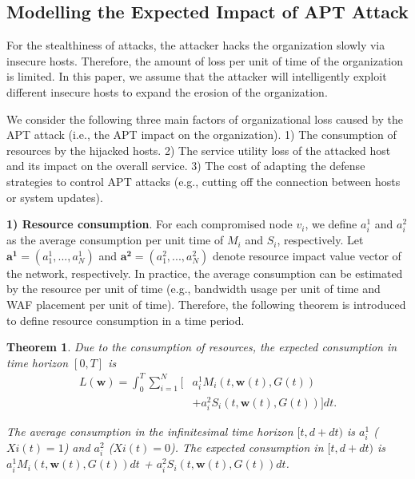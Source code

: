 \documentclass[lettersize,journal]{IEEEtran}
\newtheorem{theorem}{ \textbf{Theorem}}
\begin{document}
\subsection{Modelling the Expected Impact of APT Attack}\label{impact}
For the stealthiness of attacks, the attacker hacks the organization slowly via insecure hosts. Therefore, the amount of loss per unit of time of the organization is limited. In this paper, we assume that the attacker will intelligently exploit different insecure hosts to expand the erosion of the organization.\par
We consider the following three main factors of organizational loss caused by the APT attack (i.e., the APT impact on the organization). 1) The consumption of resources by the hijacked hosts. 2) The service utility loss of the attacked host and its impact on the overall service. 3) The cost of adapting the defense strategies to control APT attacks (e.g., cutting off the connection between hosts or system updates).\par
\textbf{1) Resource consumption}. For each compromised node $v_i$, we define $a^1_i$ and $a^2_i$ as the average consumption per unit time of $M_i$ and $S_i$, respectively. Let $\bm{a^1}=(a^1_1,...,a^1_N)$ and $\bm{a^2}=(a^2_1,...,a^2_N)$ denote resource impact value vector of the network, respectively. In practice, the average consumption can be estimated by the resource per unit of time (e.g., bandwidth usage per unit of time and WAF placement per unit of time). Therefore, the following theorem is introduced to define resource consumption in a time period.
\begin{theorem}\label{theo2}
Due to the consumption of resources, the expected consumption in time horizon $[0, T]$ is
\begin{equation}\label{eq_lost source}
    \begin{aligned}
   L(\bm{w}) =\int_0^T\sum_{i=1}^N[&a^1_i M_i(t,\bm{w}(t),G(t)) \\ &+a^2_i S_i(t,\bm{w}(t),G(t))]dt.
   \end{aligned}
\end{equation}
\begin{IEEEproof}
The average consumption in the infinitesimal time horizon $[t, d+dt)$ is $a^1_i$ ($Xi(t) = 1$) and $a^2_i$ ($Xi(t) = 0$). The expected consumption in $[t, d + dt)$ is $a^1_i M_i(t,\bm{w}(t),G(t))dt$ + $a^2_i S_i(t,\bm{w}(t),G(t))dt$. 
\end{IEEEproof}
\end{theorem}
\end{document}
